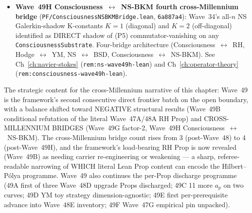 \begin{remark}
\begin{itemize}
  \item \textbf{Wave~49H Consciousness~$\leftrightarrow$~NS-BKM fourth cross-Millennium bridge} (\texttt{PF/ConsciousnessNSBKMBridge.lean}, \texttt{6a887a4}): Wave~34's all-$n$ NS Galerkin-shadow K-constants $K = 1$ (diagonal) and $K = 2$ (off-diagonal) identified as DIRECT shadow of (P5) commutator-vanishing on any \texttt{ConsciousnessSubstrate}. Four-bridge architecture (Consciousness~$\leftrightarrow$~RH, Hodge~$\leftrightarrow$~YM, NS~$\leftrightarrow$~BSD, Consciousness~$\leftrightarrow$~NS-BKM). See Ch~\ref{ch:navier-stokes} (\texttt{rem:ns-wave49h-lean}) and Ch~\ref{ch:operator-theory} (\texttt{rem:consciousness-wave49h-lean}).
\end{itemize}
The strategic content for the cross-Millennium narrative of this chapter: Wave~49 is the framework's second consecutive direct frontier batch on the open boundary, with a balance shifted toward NEGATIVE structural results (Wave~49B conditional refutation of the literal Wave~47A/48A RH Prop) and CROSS-MILLENNIUM BRIDGES (Wave~49G factor-2, Wave~49H Consciousness~$\leftrightarrow$~NS-BKM). The cross-Millennium bridge count rises from 3 (post-Wave~48) to 4 (post-Wave~49H), and the framework's load-bearing RH Prop is now revealed (Wave~49B) as needing carrier re-engineering or weakening --- a sharp, referee-readable narrowing of WHICH literal Lean Prop content can encode the Hilbert--P\'olya programme. Wave~49 also continues the per-Prop discharge programme (49A first of three Wave~48D upgrade Props discharged; 49C 11 more $a_p$ on two curves; 49D YM toy strategy dimension-agnostic; 49E first per-prerequisite advance into Wave~48E inventory; 49F Wave~47G empirical pin unpacked).


\end{remark}
